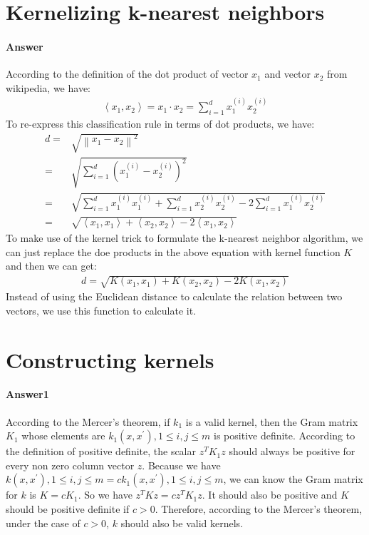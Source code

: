 \documentclass[paper=a4, fontsize=11pt]{scrartcl} %
\numberwithin{equation}{section} %
\numberwithin{figure}{section} %
\numberwithin{table}{section} %
\begin{document}
\section{Kernelizing k-nearest neighbors}

\paragraph{\textbf{Answer}}
According to the definition of the dot product of vector $x_{1}$ and vector $x_{2}$ from wikipedia, we have:
\begin{align*}
\left \langle x_{1},x_{2} \right \rangle=x_{1}\cdot x_{2}=\sum_{i=1}^{d}x_{1}^{\left ( i \right )}x_{2}^{\left ( i \right )}
\end{align*}
To re-express this classification rule in terms of dot products, we have:
\begin{align*}
d=&\sqrt{\left \| x_{1}-x_{2} \right \|^{2}}
\\=&\sqrt{\sum_{i=1}^{d}\left ( x_{1}^{\left ( i \right )} -x_{2}^{\left ( i \right )}\right )^{2}}
\\=&\sqrt{\sum_{i=1}^{d}x_{1}^{\left ( i \right )}x_{1}^{\left ( i \right )}+\sum_{i=1}^{d}x_{2}^{\left ( i \right )}x_{2}^{\left ( i \right )}-2\sum_{i=1}^{d}x_{1}^{\left ( i \right )}x_{2}^{\left ( i \right )}}
\\=&\sqrt{\left \langle x_{1},x_{1} \right \rangle+\left \langle x_{2},x_{2} \right \rangle-2\left \langle x_{1},x_{2} \right \rangle}
\end{align*}
To make use of the kernel trick to formulate the k-nearest neighbor algorithm, we can just replace the doe products in the above equation with kernel function $K$ and then we can get:
\begin{align*}
d=\sqrt{K\left ( x_{1},x_{1} \right )+K\left ( x_{2},x_{2} \right )-2K\left ( x_{1},x_{2} \right )}
\end{align*}
Instead of using the Euclidean distance to calculate the relation between two vectors, we use this function to calculate it.

\section{Constructing kernels}

\paragraph{\textbf{Answer1}}
According to the Mercer's theorem, if $k_{1}$ is a valid kernel, then the Gram matrix $K_{1}$ whose elements are $k_{1}\left ( x, x^{'} \right ),1\leq i,j\leq m$ is positive definite. According to the definition of positive definite, the scalar $z^{T}K_{1}z$ should always be positive for every non zero column vector $z$. Because we have $k\left ( x, x^{'} \right ),1\leq i,j\leq m=ck_{1}\left ( x, x^{'} \right ),1\leq i,j\leq m$, we can know the Gram matrix for $k$ is $K=cK_{1}$. So we have $z^{T}Kz=cz^{T}K_{1}z$. It should also be positive and $K$ should be positive definite if $c>0$. Therefore, according to the Mercer's theorem, under the case of $c>0$, $k$ should also be valid kernels.
\end{document}
